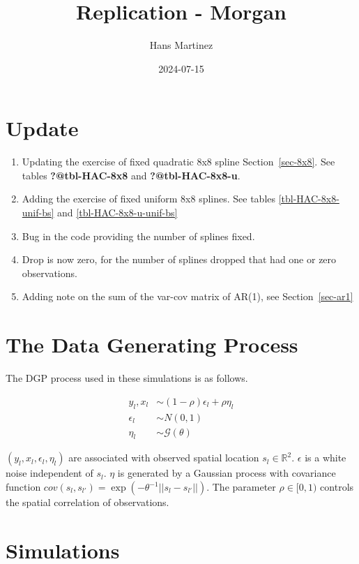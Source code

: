 \documentclass[
]{article}
\title{Replication - Morgan}
\author{Hans Martinez}
\date{2024-07-15}
\providecommand{\tightlist}{%
  \setlength{\itemsep}{0pt}\setlength{\parskip}{0pt}}\usepackage{longtable,booktabs,array}
\begin{document}
\maketitle

\section*{Update}\label{update}

\begin{enumerate}
\def\labelenumi{\arabic{enumi}.}
\tightlist
\item
  Updating the exercise of fixed quadratic 8x8 spline
  Section~\ref{sec-8x8}. See tables \textbf{?@tbl-HAC-8x8} and
  \textbf{?@tbl-HAC-8x8-u}.
\item
  Adding the exercise of fixed uniform 8x8 splines. See tables
  \ref{tbl-HAC-8x8-unif-bs} and \ref{tbl-HAC-8x8-u-unif-bs}
\item
  Bug in the code providing the number of splines fixed.
\item
  Drop is now zero, for the number of splines dropped that had one or
  zero observations.
\item
  Adding note on the sum of the var-cov matrix of AR(1), see
  Section~\ref{sec-ar1}
\end{enumerate}

\section{The Data Generating Process}\label{the-data-generating-process}

The DGP process used in these simulations is as follows.

\[
\begin{aligned}
    y_l, x_l &\sim (1-\rho)\epsilon_l +\rho \eta_l \\
    \epsilon_l &\sim N(0,1) \\
    \eta_l &\sim \mathcal{G}(\theta)
\end{aligned}
\]

\((y_l,x_l,\epsilon_l,\eta_l)\) are associated with observed spatial
location \(s_l \in \mathbb{R}^2\). \(\epsilon\) is a white noise
independent of \(s_l\). \(\eta\) is generated by a Gaussian process with
covariance function
\(cov(s_l,s_{l'})=\exp(-\theta^{-1}||s_l-s_{l'}||)\). The parameter
\(\rho\in[0,1)\) controls the spatial correlation of observations.

\section{Simulations}\label{simulations}
\end{document}
